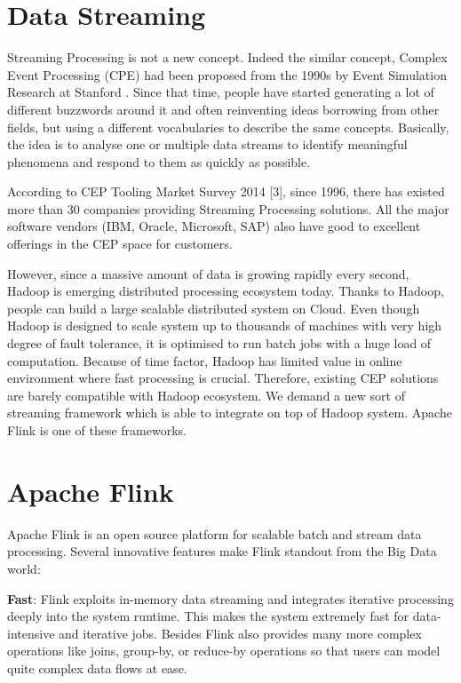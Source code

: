 \section*{Data Streaming}
Streaming Processing is not a new concept. Indeed the similar concept, Complex Event Processing (CPE) had been proposed from the 1990s by Event Simulation Research at Stanford \citep{Luckham:2001}. Since that time, people have started generating a lot of different buzzwords around it and often reinventing ideas borrowing from other fields, but using a different vocabularies to describe the same concepts. Basically, the idea is to analyse one or multiple data streams to identify meaningful phenomena and respond to them as quickly as possible. 


According to CEP Tooling Market Survey 2014 [3], since 1996, there has existed more than 30 companies providing Streaming Processing solutions. All the major software vendors (IBM, Oracle, Microsoft, SAP) also have good to excellent offerings in the CEP space for customers. 


However, since a massive amount of data is growing rapidly every second, Hadoop is emerging distributed processing ecosystem today. Thanks to Hadoop, people can build a large scalable distributed system on Cloud. Even though Hadoop is designed to scale system up to thousands of machines with very high degree of fault tolerance, it is optimised to run batch jobs with a huge load of computation. Because of time factor, Hadoop has limited value in online environment where fast processing is crucial. Therefore, existing CEP solutions are barely compatible with Hadoop ecosystem.  We demand a new sort of streaming framework which is able to integrate on top of Hadoop system. Apache Flink is one of these frameworks.


\section*{Apache Flink}

Apache Flink is an open source platform for scalable batch and stream data processing. Several innovative features make Flink standout from the Big Data world:

\textbf{Fast}: Flink exploits in-memory data streaming and integrates iterative processing deeply into the system runtime. This makes the system extremely fast for data-intensive and iterative jobs. Besides Flink also provides many more complex operations like joins, group-by, or reduce-by operations so that users can model quite complex data flows at ease.

